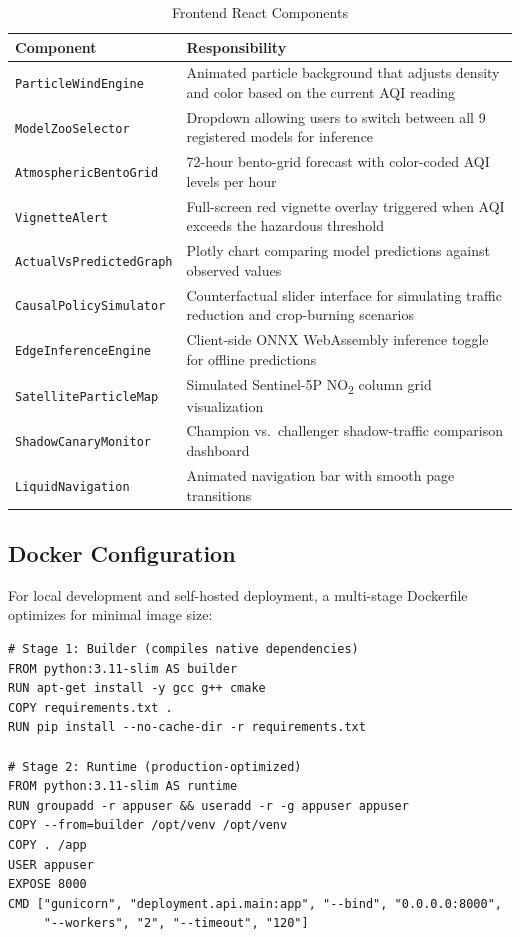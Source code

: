 \documentclass[12pt, a4paper, oneside]{article}
\begin{document}
\begin{table}[H]
\centering
\caption{Frontend React Components}
\label{tab:components}
\begin{tabularx}{\textwidth}{l X}
\toprule
\textbf{Component} & \textbf{Responsibility} \\
\midrule
\texttt{ParticleWindEngine} & Animated particle background that adjusts density and color based on the current AQI reading \\
\texttt{ModelZooSelector} & Dropdown allowing users to switch between all 9 registered models for inference \\
\texttt{AtmosphericBentoGrid} & 72-hour bento-grid forecast with color-coded AQI levels per hour \\
\texttt{VignetteAlert} & Full-screen red vignette overlay triggered when AQI exceeds the hazardous threshold \\
\texttt{ActualVsPredictedGraph} & Plotly chart comparing model predictions against observed values \\
\texttt{CausalPolicySimulator} & Counterfactual slider interface for simulating traffic reduction and crop-burning scenarios \\
\texttt{EdgeInferenceEngine} & Client-side ONNX WebAssembly inference toggle for offline predictions \\
\texttt{SatelliteParticleMap} & Simulated Sentinel-5P NO\textsubscript{2} column grid visualization \\
\texttt{ShadowCanaryMonitor} & Champion vs.\ challenger shadow-traffic comparison dashboard \\
\texttt{LiquidNavigation} & Animated navigation bar with smooth page transitions \\
\bottomrule
\end{tabularx}
\end{table}

\subsection{Docker Configuration}

For local development and self-hosted deployment, a multi-stage Dockerfile optimizes for minimal image size:

\begin{lstlisting}[caption={Multi-stage Dockerfile architecture}]
# Stage 1: Builder (compiles native dependencies)
FROM python:3.11-slim AS builder
RUN apt-get install -y gcc g++ cmake
COPY requirements.txt .
RUN pip install --no-cache-dir -r requirements.txt

# Stage 2: Runtime (production-optimized)
FROM python:3.11-slim AS runtime
RUN groupadd -r appuser && useradd -r -g appuser appuser
COPY --from=builder /opt/venv /opt/venv
COPY . /app
USER appuser
EXPOSE 8000
CMD ["gunicorn", "deployment.api.main:app", "--bind", "0.0.0.0:8000",
     "--workers", "2", "--timeout", "120"]
\end{lstlisting}
\end{document}
